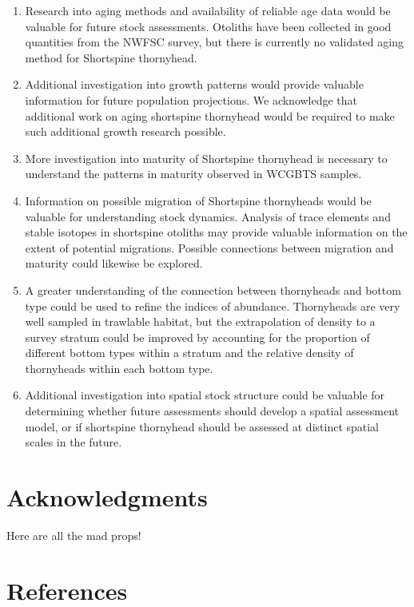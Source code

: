 \documentclass[11pt,
  english,
  letterpaper,
]{article}
\providecommand{\tightlist}{%
  \setlength{\itemsep}{0pt}\setlength{\parskip}{0pt}}
\providecommand{\tightlist}{%
  \setlength{\itemsep}{0pt}\setlength{\parskip}{0pt}}
\begin{document}
\begin{enumerate}
\def\labelenumi{\arabic{enumi}.}
\tightlist
\item
  Research into aging methods and availability of reliable age data would be valuable for future stock assessments. Otoliths have been collected in good quantities from the NWFSC survey, but there is currently no validated aging method for Shortspine thornyhead.
\item
  Additional investigation into growth patterns would provide valuable information for future population projections. We acknowledge that additional work on aging shortspine thornyhead would be required to make such additional growth research possible.
\item
  More investigation into maturity of Shortspine thornyhead is necessary to understand the patterns in maturity observed in WCGBTS samples.
\item
  Information on possible migration of Shortspine thornyheads would be valuable for understanding stock dynamics. Analysis of trace elements and stable isotopes in shortspine otoliths may provide valuable information on the extent of potential migrations. Possible connections between migration and maturity could likewise be explored.
\item
  A greater understanding of the connection between thornyheads and bottom type could be used to refine the indices of abundance. Thornyheads are very well sampled in trawlable habitat, but the extrapolation of density to a survey stratum could be improved by accounting for the proportion of different bottom types within a stratum and the relative density of thornyheads within each bottom type.
\item
  Additional investigation into spatial stock structure could be valuable for determining whether future assessments should develop a spatial assessment model, or if shortspine thornyhead should be assessed at distinct spatial scales in the future.
\end{enumerate}

\hypertarget{acknowledgments}{%
\section{Acknowledgments}\label{acknowledgments}}

Here are all the mad props!

\clearpage

\hypertarget{references}{%
\section{References}\label{references}}
\end{document}
